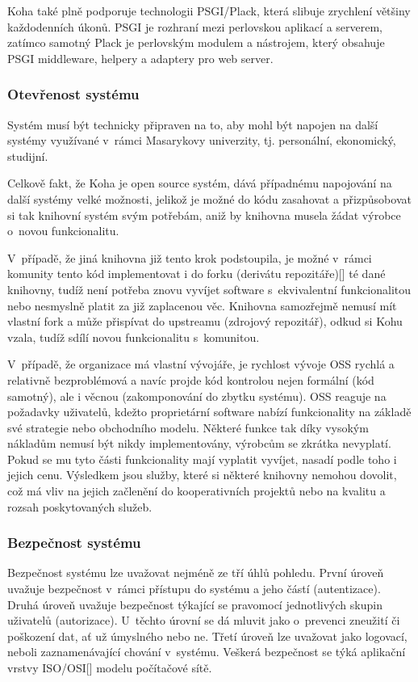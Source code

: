 \documentclass[
	11pt, oneside, printed, draft, 
	table,   %
	lof,     %
	lot     %
]{fithesis3}
\newcommand{\citepages}[2]{[\cite[#1]{#2}]}
\begin{document}
{Koha také plně podporuje technologii PSGI/Plack, která slibuje zrychlení většiny každodenních úkonů.%
 PSGI je rozhraní mezi perlovskou aplikací a serverem, zatímco samotný Plack je perlovským modulem a nástrojem, který obsahuje PSGI middleware, helpery a adaptery pro web server. %

\subsubsection{Otevřenost systému}
Systém musí být technicky připraven na to, aby mohl být napojen na další systémy využívané v~rámci Masarykovy univerzity, tj. personální, ekonomický, studijní.

Celkově fakt, že Koha je open source systém, dává případnému napojování na další systémy velké možnosti, jelikož je možné do kódu zasahovat a přizpůsobovat si tak knihovní systém svým potřebám, aniž by knihovna musela žádat výrobce o~novou funkcionalitu.

V~případě, že jiná knihovna již tento krok podstoupila, je možné v~rámci komunity tento kód  implementovat i do forku (derivátu repozitáře)\citepages{29}{Chaconc2009} té dané knihovny, tudíž není potřeba znovu vyvíjet software s~ekvivalentní funkcionalitou nebo nesmyslně platit za již zaplacenou věc. Knihovna samozřejmě nemusí mít vlastní fork a může přispívat do upstreamu (zdrojový repozitář), odkud si Kohu vzala, tudíž sdílí novou funkcionalitu s~komunitou.

V~případě, že organizace má vlastní vývojáře, je rychlost vývoje OSS rychlá a relativně bezproblémová a navíc projde kód kontrolou nejen formální (kód samotný), ale i věcnou (zakomponování do zbytku systému). OSS reaguje na požadavky uživatelů, kdežto proprietární software nabízí funkcionality na základě své strategie nebo obchodního modelu. Některé funkce tak díky vysokým nákladům nemusí být nikdy implementovány, výrobcům se zkrátka nevyplatí. Pokud se mu tyto části funkcionality mají vyplatit vyvíjet, nasadí podle toho i jejich cenu. Výsledkem jsou služby, které si některé knihovny nemohou dovolit, což má vliv na jejich začlenění do kooperativních projektů nebo na kvalitu a rozsah poskytovaných služeb.

\subsubsection{Bezpečnost systému}
Bezpečnost systému lze uvažovat nejméně ze tří úhlů pohledu. První úroveň uvažuje bezpečnost v~rámci přístupu do systému a jeho částí (autentizace). Druhá úroveň uvažuje bezpečnost týkající se pravomocí jednotlivých skupin uživatelů (autorizace). U~těchto úrovní se dá mluvit jako o~prevenci zneužití či poškození dat, ať už úmyslného nebo ne. Třetí úroveň lze uvažovat jako logovací, neboli zaznamenávající chování v~systému. Veškerá bezpečnost se týká aplikační vrstvy ISO/OSI\citepages{80-82}{kurose_ross_2014} modelu počítačové sítě.

}
\end{document}
